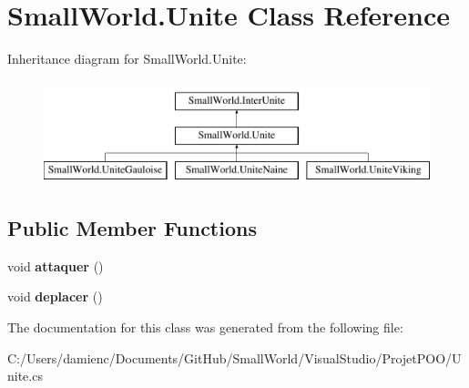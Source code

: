 \hypertarget{class_small_world_1_1_unite}{\section{Small\-World.\-Unite Class Reference}
\label{class_small_world_1_1_unite}
}
Inheritance diagram for Small\-World.\-Unite\-:\begin{figure}[H]
\begin{center}
\leavevmode
\includegraphics[height=3.000000cm]{class_small_world_1_1_unite}
\end{center}
\end{figure}
\subsection*{Public Member Functions}
\begin{DoxyCompactItemize}
\item 
\hypertarget{class_small_world_1_1_unite_a5e792891c8194bd5344cf1d3a897226a}{void {\bfseries attaquer} ()}\label{class_small_world_1_1_unite_a5e792891c8194bd5344cf1d3a897226a}

\item 
\hypertarget{class_small_world_1_1_unite_a51ba4ffd6b0029b1cc7be453f47730c5}{void {\bfseries deplacer} ()}\label{class_small_world_1_1_unite_a51ba4ffd6b0029b1cc7be453f47730c5}

\end{DoxyCompactItemize}


The documentation for this class was generated from the following file\-:\begin{DoxyCompactItemize}
\item 
C\-:/\-Users/damienc/\-Documents/\-Git\-Hub/\-Small\-World/\-Visual\-Studio/\-Projet\-P\-O\-O/Unite.\-cs\end{DoxyCompactItemize}
